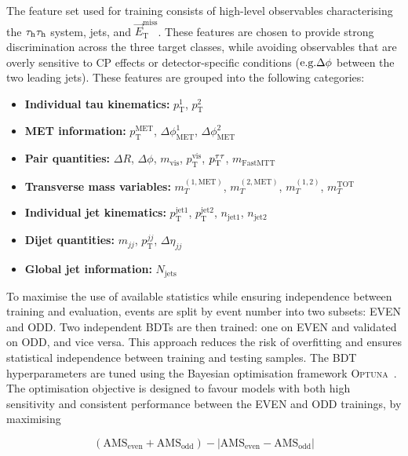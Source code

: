 The feature set used for training consists of high-level observables characterising the $\tau_\mathrm{h}\tau_\mathrm{h}$ system, jets, and $\vec{E}^{\text{miss}}_\text{T}$. These features are chosen to provide strong discrimination across the three target classes, while avoiding observables that are overly sensitive to CP effects or detector-specific conditions ($\mbox{e.g.} \Delta\phi$ between the two leading jets). These features are grouped into the following categories: 
\begin{itemize}
    \item \textbf{Individual tau kinematics:} $p_\text{T}^{1}$, $p_\text{T}^{2}$
    \item \textbf{MET information:} $p_\text{T}^{\text{MET}}$, $\Delta\phi^{1}_{\text{MET}}$, $\Delta\phi^{2}_{\text{MET}}$
    \item \textbf{Pair quantities:} $\Delta R$, $\Delta\phi$, $m_{\text{vis}}$, $p_\text{T}^{\text{vis}}$, $p_\text{T}^{\tau\tau}$, $m_{\text{FastMTT}}$
    \item \textbf{Transverse mass variables:} $m_{T}^{(1,\text{MET})}$, $m_{T}^{(2,\text{MET})}$, $m_{T}^{(1,2)}$, $m_T^{\text{TOT}}$
    \item \textbf{Individual jet kinematics:} $p_\text{T}^{\text{jet1}}$, $p_\text{T}^{\text{jet2}}$, $n_{\text{jet1}}$, $n_{\text{jet2}}$
    \item \textbf{Dijet quantities:} $m_{jj}$, $p_\text{T}^{jj}$, $\Delta\eta_{jj}$
    \item \textbf{Global jet information:} $N_{\text{jets}}$
\end{itemize}

To maximise the use of available statistics while ensuring independence between training and evaluation, events are split by event number into two subsets: EVEN and ODD. 
Two independent \acp{BDT} are then trained: one on EVEN and validated on ODD, and vice versa. 
This approach reduces the risk of overfitting and ensures statistical independence between training and testing samples. The BDT hyperparameters are tuned using the Bayesian optimisation framework \textsc{Optuna}~\cite{akiba2019optunanextgenerationhyperparameteroptimization}. The optimisation objective is designed to favour models with both high sensitivity and consistent performance between the EVEN and ODD trainings, by maximising

\begin{equation}
    (\mathrm{AMS}_{\text{even}} + \mathrm{AMS}_{\text{odd}}) - |\mathrm{AMS}_{\text{even}} - \mathrm{AMS}_{\text{odd}}|
\end{equation}


